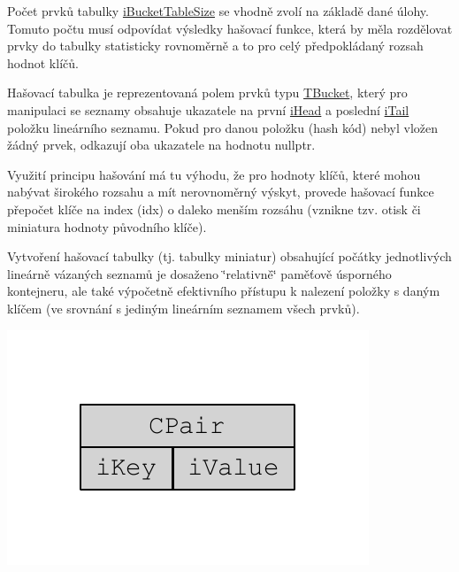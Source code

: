 Počet prvků tabulky \hyperlink{class_c_hash_map_a8745c6aa08e235500828dea0ad30b548}{i\+Bucket\+Table\+Size} se vhodně zvolí na základě dané úlohy. Tomuto počtu musí odpovídat výsledky hašovací funkce, která by měla rozdělovat prvky do tabulky statisticky rovnoměrně a to pro celý předpokládaný rozsah hodnot klíčů.

Hašovací tabulka je reprezentovaná polem prvků typu \hyperlink{struct_c_hash_map_1_1_t_bucket}{T\+Bucket}, který pro manipulaci se seznamy obsahuje ukazatele na první \hyperlink{struct_c_hash_map_1_1_t_bucket_a03a10c5ce912fd09137778c3454e7d77}{i\+Head} a poslední \hyperlink{struct_c_hash_map_1_1_t_bucket_a1b8b634924907ed251a58eee989d577a}{i\+Tail} položku lineárního seznamu. Pokud pro danou položku (hash kód) nebyl vložen žádný prvek, odkazují oba ukazatele na hodnotu {\ttfamily nullptr}.

Využití principu hašování má tu výhodu, že pro hodnoty klíčů, které mohou nabývat širokého rozsahu a mít nerovnoměrný výskyt, provede hašovací funkce přepočet klíče na index ({\ttfamily idx}) o daleko menším rozsáhu (vznikne tzv. otisk či miniatura hodnoty původního klíče).

Vytvoření hašovací tabulky (tj. tabulky miniatur) obsahující počátky jednotlivých lineárně vázaných seznamů je dosaženo \char`\"{}relativně\char`\"{} paměťově úsporného kontejneru, ale také výpočetně efektivního přístupu k nalezení položky s daným klíčem (ve srovnání s jediným lineárním seznamem všech prvků).


\begin{DoxyImage}
\includegraphics[width=\textwidth,height=\textheight/2,keepaspectratio=true]{dot_CPair}
\end{DoxyImage}
~\newline
 
